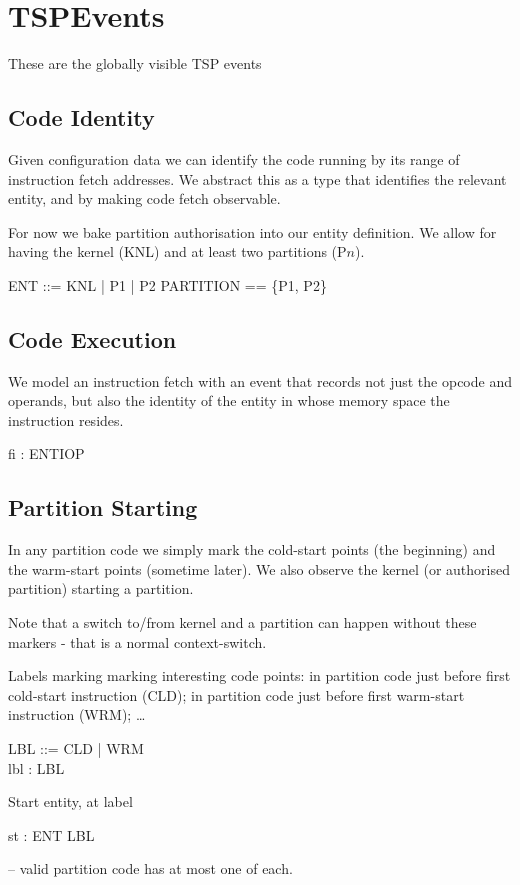 \section{TSPEvents}

These are the globally visible TSP events

\subsection{Code Identity}%

Given configuration data we can identify the code running
by its range of instruction fetch addresses.
We abstract this as a type that identifies the relevant entity,
and by making code fetch observable.

For now we bake partition authorisation into our entity definition.
We allow for having the kernel (KNL) and at least two partitions (P$n$).
\begin{circus}
ENT ::= KNL | P1 | P2
\also
PARTITION == \{P1, P2\}
\end{circus}

\subsection{Code Execution}

We model an instruction fetch with an event that records not just the opcode
and operands, but also the identity of the entity in whose memory space the
instruction resides.

\begin{circus}

\circchannel fi : ENT\cross I\cross OP
\end{circus}

\subsection{Partition Starting}

In any partition code we simply mark the cold-start points (the beginning)
and the warm-start points (sometime later).
We also observe the kernel (or authorised partition) starting a partition.

Note that a switch to/from kernel and a partition can happen without these
markers - that is a normal context-switch.

Labels marking marking interesting code points:
in partition code just before first cold-start instruction (CLD);
in partition code just before first warm-start instruction (WRM);
\dots
\begin{circus}
LBL ::= CLD | WRM
\\
\circchannel lbl : LBL
\end{circus}
Start entity, at label
\begin{circus}
\circchannel st : ENT \cross LBL
\end{circus}
-- valid partition code has at most one of each.

